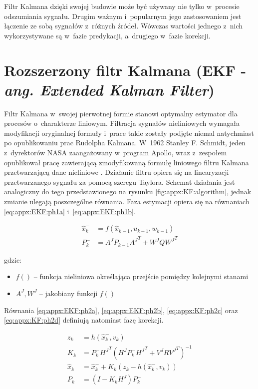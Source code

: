 Filtr Kalmana dzięki swojej budowie może być używany nie tylko w~procesie odszumiania sygnału. Drugim ważnym i~popularnym jego zastosowaniem jest łączenie ze sobą sygnałów z~różnych źródeł. Wówczas wartości jednego z~nich wykorzystywane są w~fazie predykacji, a~drugiego w~fazie korekcji.


\section*{Rozszerzony filtr Kalmana (EKF - \emph{ang. Extended Kalman Filter})}
\label{sec:appx:filters:EKF}
Filtr Kalmana w~swojej pierwotnej formie stanowi optymalny estymator dla procesów o~charakterze liniowym. Filtracja sygnałów nieliniowych wymagała modyfikacji oryginalnej formuły i~prace takie zostały podjęte niemal natychmiast po opublikowaniu prac Rudolpha Kalmana. W~1962 Stanley F. Schmidt, jeden z~dyrektorów NASA zaangażowany w~program Apollo, wraz z~zespołem opublikował pracę zawierającą zmodyfikowaną formułę liniowego filtru Kalmana przetwarzającą dane nieliniowe \cite{smith1962application}. Działanie filtru opiera się na linearyzacji przetwarzanego sygnału za pomocą szeregu Taylora. Schemat działania jest analogiczny do tego przedstawionego na rysunku \ref{fig:appx:KF:algorithm}, jednak zmianie ulegają poszczególne równania. Faza estymacji opiera się na równaniach \eqref{eq:appx:EKF:ph1a} i~\eqref{eq:appx:EKF:ph1b}.

\begin{subequations}
	\begin{align}
	\widehat{x}^-_k & = f(\widehat{x}_{k-1}, u_{k-1}, w_{k-1})\label{eq:appx:EKF:ph1a} \\
	P^-_k           & = A^J P_{k-1} {A^J}^T + W^J Q {W^J}^T \label{eq:appx:EKF:ph1b}   
	\end{align}
\end{subequations}

gdzie:
\begin{itemize}
	\item $f()$ -- funkcja nieliniowa określająca przejście pomiędzy kolejnymi stanami
	\item $A^J , W^J$ -- jakobiany funkcji $f()$
\end{itemize}

Równania \eqref{eq:appx:EKF:ph2a}, \eqref{eq:appx:EKF:ph2b}, \eqref{eq:appx:KF:ph2c} oraz \eqref{eq:appx:KF:ph2d} definiują natomiast fazę korekcji.

\begin{subequations}
	\begin{align}
	z_k           & = h(\widehat{x}^-_k, v_k) \label{eq:appx:EKF:ph2a}                                 \\
	K_k           & = P^-_{k}{H^J}^T(H^J P^-_{k}{H^J}^T + V^J R {V^J}^T)^{-1} \label{eq:appx:EKF:ph2b} \\
	\widehat{x}_k & = \widehat{x}^-_k + K_{k}(z_k-h(\widehat{x}^-_k, v_k))  \label{eq:appx:EKF:ph2c}   \\
	P_k           & = (I-K_{k}H^J)P^-_k \label{eq:appx:EKF:ph2d}                                       
	\end{align}
\end{subequations}

